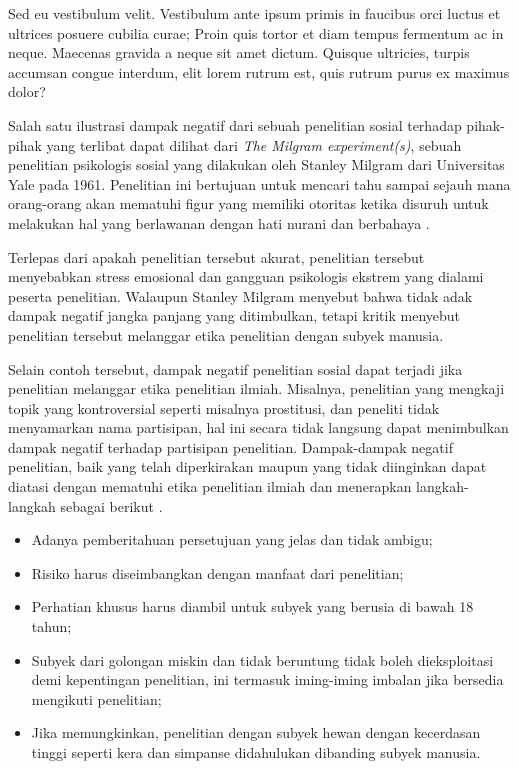 	\question
Sed eu vestibulum velit. Vestibulum ante ipsum primis in faucibus orci luctus et ultrices posuere 
cubilia curae; Proin quis tortor et diam tempus fermentum ac in neque. Maecenas gravida a neque sit 
amet dictum. Quisque ultricies, turpis accumsan congue interdum, elit lorem rutrum est, quis rutrum 
purus ex maximus dolor?
\begin{solution}
	Salah satu ilustrasi dampak negatif dari sebuah penelitian sosial terhadap pihak-pihak yang terlibat dapat dilihat dari \textit{The Milgram experiment(s)}, sebuah penelitian psikologis sosial yang dilakukan oleh Stanley Milgram dari Universitas Yale pada 1961.
	Penelitian ini bertujuan untuk mencari tahu sampai sejauh mana orang-orang akan mematuhi figur yang memiliki otoritas ketika disuruh untuk melakukan hal yang berlawanan dengan hati nurani dan berbahaya \cite{milgram_behavioral_1963}.
	
	Terlepas dari apakah penelitian tersebut akurat, penelitian tersebut menyebabkan stress emosional dan gangguan psikologis ekstrem yang dialami peserta penelitian.
	Walaupun Stanley Milgram menyebut bahwa tidak adak dampak negatif jangka panjang yang ditimbulkan, tetapi kritik menyebut penelitian tersebut melanggar etika penelitian dengan subyek manusia.
	
	Selain contoh tersebut, dampak negatif penelitian sosial dapat terjadi jika penelitian melanggar etika penelitian ilmiah.
	Misalnya, penelitian yang mengkaji topik yang kontroversial seperti misalnya prostitusi, dan peneliti tidak menyamarkan nama partisipan, hal ini secara tidak langsung dapat menimbulkan dampak negatif terhadap partisipan penelitian.
	Dampak-dampak negatif penelitian, baik yang telah diperkirakan maupun yang tidak diinginkan dapat diatasi dengan mematuhi etika penelitian ilmiah dan menerapkan langkah-langkah sebagai berikut \cite{sass_reichsrundschreiben_1983}.
	\begin{itemize}
		\item Adanya pemberitahuan persetujuan yang jelas dan tidak ambigu;
		\item Risiko harus diseimbangkan dengan manfaat dari penelitian;
		\item Perhatian khusus harus diambil untuk subyek yang berusia di bawah 18 tahun;
		\item Subyek dari golongan miskin dan tidak beruntung tidak boleh dieksploitasi demi kepentingan penelitian, ini termasuk iming-iming imbalan jika bersedia mengikuti penelitian;
		\item Jika memungkinkan, penelitian dengan subyek hewan dengan kecerdasan tinggi seperti kera dan simpanse didahulukan dibanding subyek manusia.
	\end{itemize}
\end{solution}
